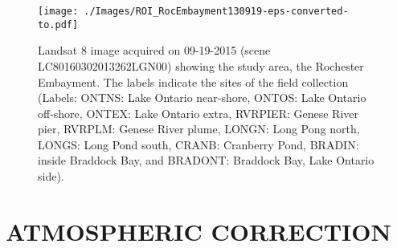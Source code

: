 \documentclass[]{spie}  %
\begin{document}
\begin{figure}[htbp!]
  \centering
  \texttt{[image: ./Images/ROI\_RocEmbayment130919-eps-converted-to.pdf]}
  \caption{Landsat 8 image acquired on 09-19-2015 (scene LC80160302013262LGN00) showing the study area, the Rochester Embayment. The labels indicate the sites of the field collection (Labels: ONTNS: Lake Ontario near-shore, ONTOS: Lake Ontario off-shore, ONTEX: Lake Ontario extra, RVRPIER: Genese River pier, RVRPLM: Genese River plume, LONGN: Long Pong north, LONGS: Long Pond south, CRANB: Cranberry Pond, BRADIN: inside Braddock Bay, and BRADONT: Braddock Bay, Lake Ontario side).\label{fig:RrsROIs130919} } 
\end{figure}

\section{ATMOSPHERIC CORRECTION}
\label{sec:atmcorr}  %
\end{document}
